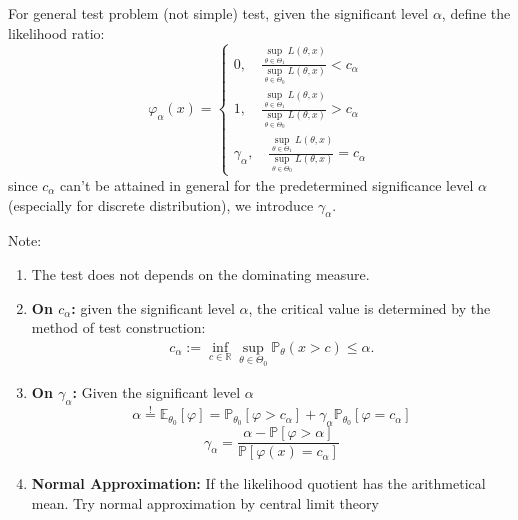 \begin{method}\label{Test}
For general test problem (not simple) test, given the significant level $\alpha$, define the likelihood ratio: 
\begin{equation}
    \varphi_\alpha(x) = 
    \left\{\begin{aligned}
        0,  \quad   \frac{\sup_{\theta \in \Theta_1}L(\theta, x)}{\sup_{\theta \in \Theta_0} L(\theta, x)} < c_{\alpha}\\
        1,  \quad \frac{\sup_{\theta \in \Theta_1}L(\theta, x)}{\sup_{\theta \in \Theta_0} L(\theta, x)} > c_{\alpha}\\
        \gamma_{\alpha}, \quad \frac{\sup_{\theta \in \Theta_1}L(\theta, x)}{\sup_{\theta \in \Theta_0} L(\theta, x)} = c_{\alpha} 
    \end{aligned}\right.
\end{equation}
since $c_\alpha$ can't be attained in general for the predetermined significance level $\alpha$(especially for discrete distribution), we introduce $\gamma_\alpha$. 
\end{method}
\begin{remark}
Note:
\begin{enumerate}
    \item The test does not depends on the dominating measure.
    \item \textbf{On $c_\alpha$:} given the significant level $\alpha$, the critical value is determined by the method of test construction:
    \begin{align*}
    	c_\alpha:= \inf_{c \in \mathbb{R}} \sup_{\theta \in \Theta_0} \mathbb{P}_\theta ( x > c) \le \alpha. 
    \end{align*} 
    \item \textbf{On  $\gamma_\alpha$:} Given the significant level $\alpha$
    \begin{equation*}
        \alpha \overset{!}{=} \mathbb{E}_{\theta_{0}}[\varphi] = \mathbb{P}_{\theta_{0}}[\varphi > c_{\alpha}] + \gamma_\alpha \mathbb{P}_{\theta_{0}}[\varphi = c_\alpha]
    \end{equation*}
    \begin{equation*}
        \gamma_\alpha = \frac{\alpha - \mathbb{P}[\varphi > \alpha]}{\mathbb{P}[\varphi(x) = c_{\alpha}]}
    \end{equation*}
    \item \textbf{Normal Approximation:} If the likelihood quotient has the arithmetical mean. Try normal approximation by central limit theory
\end{enumerate}
\end{remark}


